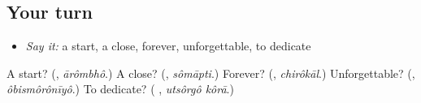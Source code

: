 \subsection*{Your turn}
\begin{itemize}
\raggedright
  \item \emph{Say it:} a start, a close, forever, unforgettable, to dedicate
\end{itemize}

\begin{tcolorbox}[breakable,colback=teal!4,colframe=teal!35!black,title={Before you move on}]
A start? (\textbf{}, \emph{ārômbhô}.) A close? (\textbf{}, \emph{sômāpti}.) Forever? (\textbf{}, \emph{chirôkāl}.) Unforgettable? (\textbf{}, \emph{ôbismôrônīyô}.) To dedicate? (\textbf{ }, \emph{utsôrgô kôrā}.)
\end{tcolorbox}
